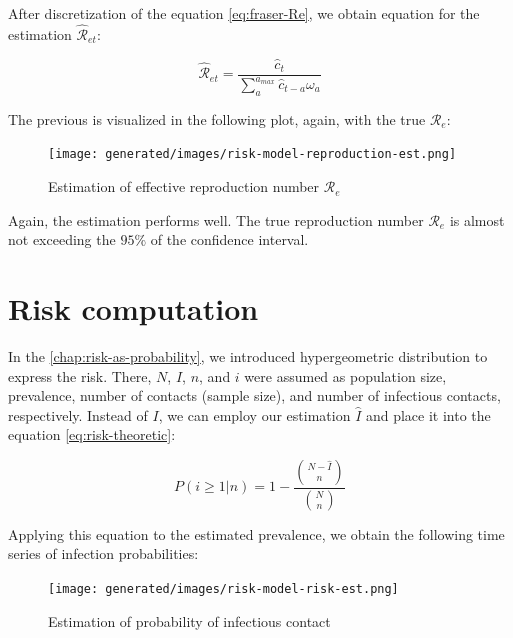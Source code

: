 \documentclass[
  digital, %
  oneside, %
  lof,     %
  lot,     %
]{fithesis4}
\begin{document}
After discretization of the equation \ref{eq:fraser-Re}, we obtain equation for the estimation $\hat{\mathcal{R}}_{et}$:

\begin{equation}
  \hat{\mathcal{R}}_{et} = \frac{\hat{c}_t}{\sum_a^{a_{max}} \hat{c}_{t - a} \omega_a}
\end{equation}

The previous is visualized in the following plot, again, with the true $\mathcal{R}_e$:

\begin{figure}[H]
  \begin{center}
    \texttt{[image: generated/images/risk-model-reproduction-est.png]}
  \end{center}
  \caption{Estimation of effective reproduction number $\mathcal{R}_e$}
  \label{fig:risk-model-reproduction-est}
\end{figure}

Again, the estimation performs well.
The true reproduction number $\mathcal{R}_e$ is almost not exceeding the $95 \%$ of the confidence interval.


\section{Risk computation}

In the \autoref{chap:risk-as-probability}, we introduced hypergeometric distribution to express the risk.
There, $N$, $I$, $n$, and $i$ were assumed as population size, prevalence, number of contacts (sample size), and number of infectious contacts, respectively.
Instead of $I$, we can employ our estimation $\hat{I}$ and place it into the equation \ref{eq:risk-theoretic}:


\begin{equation}
  P(i \geq 1|n) = 1 - \frac{
    \binom{N - \hat{I}}{n}
  }{
    \binom{N}{n}
  }
\end{equation}

Applying this equation to the estimated prevalence, we obtain the following time series of infection probabilities:

\begin{figure}[H]
  \begin{center}
    \texttt{[image: generated/images/risk-model-risk-est.png]}
  \end{center}
  \caption{Estimation of probability of infectious contact}
  \label{fig:risk-model-risk-est}
\end{figure}
\end{document}

